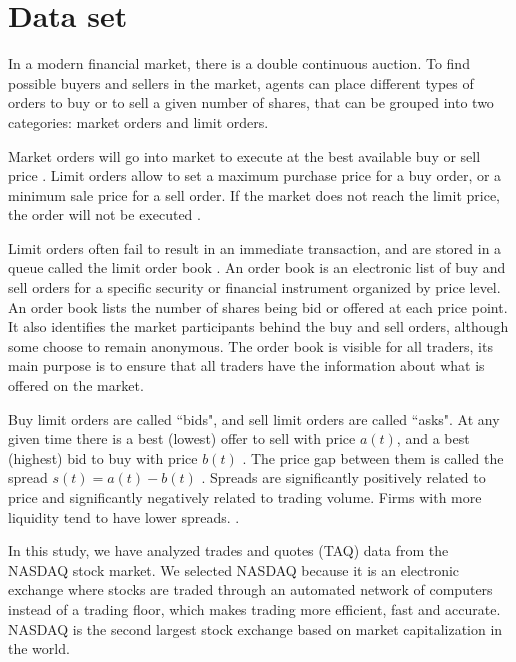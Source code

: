 \section{Data set}\label{sec:data}

In a modern financial market, there is a double continuous auction. To find
possible buyers and sellers in the market, agents can place different types of
orders to buy or to sell a given number of shares, that can be grouped into
two categories: market orders and limit orders.

Market orders will go into market to execute at the best available buy or sell
price \cite{large_prices_changes,predictive_pow,stat_theory}. Limit orders
allow to set a maximum purchase price for a buy order, or a minimum sale price
for a sell order. If the market does not reach the limit price, the order will
not be executed \cite{large_prices_changes,predictive_pow,stat_theory}.

Limit orders often fail to result in an immediate transaction, and are stored
in a queue called the limit order book
\cite{prop_order_book,stat_prop,predictive_pow}. An order book is an electronic
list of buy and sell orders for a specific security or financial instrument
organized by price level. An order book lists the number of shares being bid or
offered at each price point. It also identifies the market participants behind
the buy and sell orders, although some choose to remain anonymous. The order
book is visible for all traders, its main purpose is to ensure that all traders
have the information about what is offered on the market.

Buy limit orders are called ``bids", and sell limit orders are called ``asks".
At any given time there is a best (lowest) offer to sell with price
$a\left(t\right)$, and a best (highest) bid to buy with price $b\left(t\right)$
\cite{subtle_nature,account_spread,limit_ord_spread,prop_order_book,stat_theory}.
The price gap between them is called the spread
$s\left(t\right) = a\left(t\right)-b\left(t\right)$
\cite{subtle_nature,Bouchaud_2004,large_prices_changes,account_spread,market_digest,stat_theory}.
Spreads are significantly positively related to price and significantly
negatively related to trading volume. Firms with more liquidity tend to have
lower spreads.
\cite{account_spread,effects_spread,components_spread,components_spread_tokyo}.

In this study, we have analyzed trades and quotes (TAQ) data from the NASDAQ
stock market. We selected NASDAQ because it is an electronic exchange where
stocks are traded through an automated network of computers instead of a
trading floor, which makes trading more efficient, fast and accurate. NASDAQ is
the second largest stock exchange based on market capitalization in the world.

